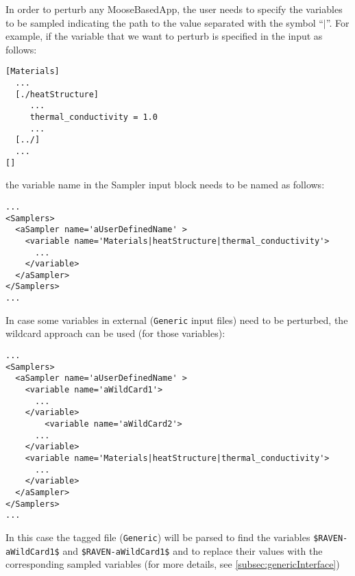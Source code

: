 In order to perturb any MooseBasedApp, the user needs to specify the variables to be
sampled indicating the path to the value separated with the symbol ``$|$''. For example,
if the variable that we want to perturb is specified in the input as follows:
\begin{lstlisting}[style=XML]
[Materials]
  ...
  [./heatStructure]
     ...
     thermal_conductivity = 1.0
     ...
  [../]
  ...
[]
\end{lstlisting}
the variable name in the Sampler input block needs to be named as follows:
\begin{lstlisting}[style=XML]
...
<Samplers>
  <aSampler name='aUserDefinedName' >
    <variable name='Materials|heatStructure|thermal_conductivity'>
      ...
    </variable>
  </aSampler>
</Samplers>
...
\end{lstlisting}
%
In case some variables in external (\texttt{Generic} input files) need to be perturbed, 
the wildcard approach can be used (for those variables):
\begin{lstlisting}[style=XML]
...
<Samplers>
  <aSampler name='aUserDefinedName' >
    <variable name='aWildCard1'>
      ...
    </variable>
        <variable name='aWildCard2'>
      ...
    </variable>
    <variable name='Materials|heatStructure|thermal_conductivity'>
      ...
    </variable>
  </aSampler>
</Samplers>
...
\end{lstlisting}
In this case the tagged file (\texttt{Generic}) will be parsed to find the variables
\texttt{\$RAVEN-aWildCard1\$} and \texttt{\$RAVEN-aWildCard1\$} and to replace their values
with the corresponding sampled variables (for more details, see  \ref{subsec:genericInterface})

